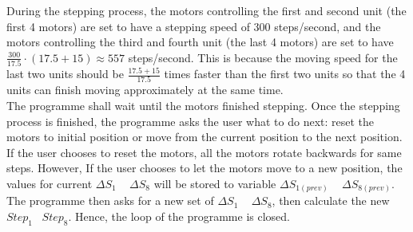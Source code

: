 \begin{itemize}
    During the stepping process, the motors controlling the first and second unit (the first 4 motors) are set 
    to have a stepping speed of 300 steps/second, and the motors controlling the third and fourth unit 
    (the last 4 motors) are set to have $\frac{300}{17.5}\cdot(17.5+15)\approx 557$ steps/second. This is because 
    the moving speed for the last two units should be $\frac{17.5+15}{17.5}$ times faster than the first two units 
    so that the 4 units can finish moving approximately at the same time. \\
    The programme shall wait until the motors finished stepping. Once the stepping process is finished, the programme 
    asks the user what to do next: reset the motors to initial position or move from the current position to the 
    next position. If the user chooses to reset the motors, all the motors rotate backwards for same steps. 
    However, If the user chooses to let the motors move to a new position, the values for current $\Delta S_1$ ~ 
    $\Delta S_8$ will be stored to variable $\Delta S_{1(prev)}$ ~ $\Delta S_{8(prev)}$. The programme then asks for 
    a new set of $\Delta S_1$ ~ $\Delta S_8$, then calculate the new $Step_1$ ~$Step_8$. Hence, the loop of the 
    programme is closed.
\end{itemize}
